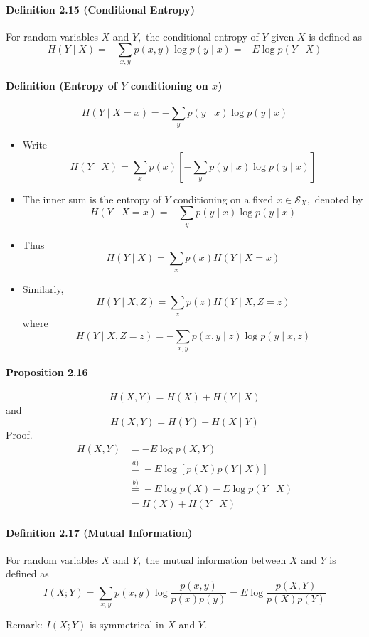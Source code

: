 \documentclass[8pt]{article}
\begin{document}
\begin{tcolorbox}
\paragraph{Definition 2.15 (Conditional Entropy)} For random variables $X$ and $Y,$ the conditional entropy of $Y$ given $X$ is defined as
$$
H(Y \mid X)=-\sum_{x, y} p(x, y) \log p(y \mid x)=-E \log p(Y \mid X)
$$
\end{tcolorbox}

\begin{tcolorbox}
\paragraph{Definition (Entropy of $Y$ conditioning on $x$)}
$$H(Y \mid X=x) = -\sum_{y} p(y \mid x) \log p(y \mid x)$$
\end{tcolorbox}
\begin{itemize}
	\item Write
	$$
	H(Y \mid X)=\sum_{x} p(x)\left[-\sum_{y} p(y \mid x) \log p(y \mid x)\right]
	$$
	\item The inner sum is the entropy of $Y$ conditioning on a fixed $x \in \mathcal{S}_{X},$ denoted by 
	$$H(Y \mid X=x) = -\sum_{y} p(y \mid x) \log p(y \mid x)$$
	\item Thus
	$$
	H(Y \mid X)=\sum_{x} p(x) H(Y \mid X=x)
	$$
	\item Similarly,
	$$
	H(Y \mid X, Z)=\sum_{z} p(z) H(Y \mid X, Z=z)
	$$
	where
	$$
	H(Y \mid X, Z=z)=-\sum_{x, y} p(x, y \mid z) \log p(y \mid x, z)
	$$
\end{itemize}

\paragraph{Proposition 2.16}
$$
H(X, Y)=H(X)+H(Y \mid X)
$$
and
$$
H(X, Y)=H(Y)+H(X \mid Y)
$$
Proof.
$$
\begin{aligned}
H(X, Y) &=-E \log p(X, Y) \\
& \stackrel{a)}{=}-E \log [p(X) p(Y \mid X)] \\
& \stackrel{b)}{=}-E \log p(X)-E \log p(Y \mid X) \\
&=H(X)+H(Y \mid X)
\end{aligned}
$$

\begin{tcolorbox}
\paragraph{Definition 2.17 (Mutual Information)} For random variables $X$ and $Y,$ the mutual information between $X$ and $Y$ is defined as
$$
I(X ; Y)=\sum_{x, y} p(x, y) \log \frac{p(x, y)}{p(x) p(y)}=E \log \frac{p(X, Y)}{p(X) p(Y)}
$$
\end{tcolorbox}
Remark: $I(X ; Y)$ is symmetrical in $X$ and $Y$.
\end{document}
